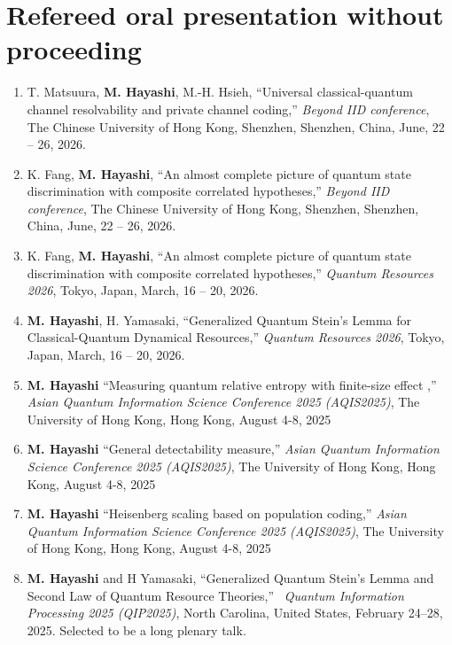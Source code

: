 \documentclass[a4paper,12pt,oneside]{article}
\begin{document}
\section{Refereed oral presentation without proceeding}
\begin{enumerate}

\item
T. Matsuura, \textbf{M. Hayashi}, M.-H. Hsieh,
``Universal classical-quantum channel resolvability and private channel coding,''
{\em Beyond IID conference},
The Chinese University of Hong Kong, Shenzhen, Shenzhen, China,
June, 22 -- 26, 2026.

\item
K. Fang, \textbf{M. Hayashi}, 
``An almost complete picture of quantum state discrimination with composite correlated hypotheses,''
{\em Beyond IID conference},
The Chinese University of Hong Kong, Shenzhen, Shenzhen, China,
June, 22 -- 26, 2026.

\item
K. Fang, \textbf{M. Hayashi}, 
``An almost complete picture of quantum state discrimination with composite correlated hypotheses,''
{\em Quantum Resources 2026}, Tokyo, Japan,
March, 16 -- 20, 2026.

\item
\textbf{M. Hayashi}, H. Yamasaki,
``Generalized Quantum Stein’s Lemma for Classical-Quantum Dynamical Resources,''
{\em Quantum Resources 2026}, Tokyo, Japan,
March, 16 -- 20, 2026.

\item
\textbf{M. Hayashi} 
``Measuring quantum relative entropy with finite-size effect	,''	
{\em Asian Quantum Information Science Conference 2025 (AQIS2025)}, 
The University of Hong Kong, Hong Kong, August 4-8, 2025

\item
\textbf{M. Hayashi} 
``General detectability measure,''	
{\em Asian Quantum Information Science Conference 2025 (AQIS2025)}, 
The University of Hong Kong, Hong Kong, August 4-8, 2025

\item
\textbf{M. Hayashi} 
``Heisenberg scaling based on population coding,''	
{\em Asian Quantum Information Science Conference 2025 (AQIS2025)}, 
The University of Hong Kong, Hong Kong, August 4-8, 2025

\item
\textbf{M. Hayashi} and H Yamasaki, 
``Generalized Quantum Stein's Lemma and Second Law of Quantum Resource Theories,''  
{\em Quantum Information Processing 2025 (QIP2025)}, North Carolina, United States, February 24–28,
2025. Selected to be a long plenary talk. 


\end{enumerate}
\end{document}
